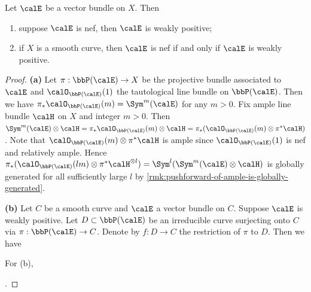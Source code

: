 \begin{proposition}
	Let $\calE$ be a vector bundle on $X$.
	Then
	\begin{enumerate}
		\item suppose $\calE$ is nef, then $\calE$ is weakly positive;
		\item if $X$ is a smooth curve, then $\calE$ is nef if and only if $\calE$ is weakly positive.
	\end{enumerate}
\end{proposition}
\begin{proof}
	\textbf{(a)}
	Let $\pi:\bbP(\calE)\to X$ be the projective bundle associated to $\calE$ and $\calO_{\bbP(\calE)}(1)$ the tautological line bundle on $\bbP(\calE)$.
	Then we have $\pi_*\calO_{\bbP(\calE)}(m)=\Sym^m(\calE)$ for any $m>0$.
	Fix ample line bundle $\calH$ on $X$ and integer $m>0$.
	Then $\Sym^m(\calE)\otimes \calH = \pi_*\calO_{\bbP(\calE)}(m)\otimes \calH = \pi_*(\calO_{\bbP(\calE)}(m)\otimes \pi^*\calH)$.
	Note that $\calO_{\bbP(\calE)}(m)\otimes \pi^*\calH$ is ample since $\calO_{\bbP(\calE)}(1)$ is nef and relatively ample.
	Hence $\pi_*(\calO_{\bbP(\calE)}(lm)\otimes \pi^*\calH^{\otimes l}) = \Sym^{l}(\Sym^{m}(\calE)\otimes \calH)$ is globally generated for all sufficiently large $l$ by \cref{rmk:pushforward-of-ample-is-globally-generated}.

	\textbf{(b)}
	Let $C$ be a smooth curve and $\calE$ a vector bundle on $C$.
	Suppose $\calE$ is weakly positive.
	Let $D \subset \bbP(\calE)$ be an irreducible curve surjecting onto $C$ via $\pi:\bbP(\calE)\to C$.
	Denote by $f: D \to C$ the restriction of $\pi$ to $D$.
	Then we have


	For (b),


	\Yang{}.
\end{proof}

